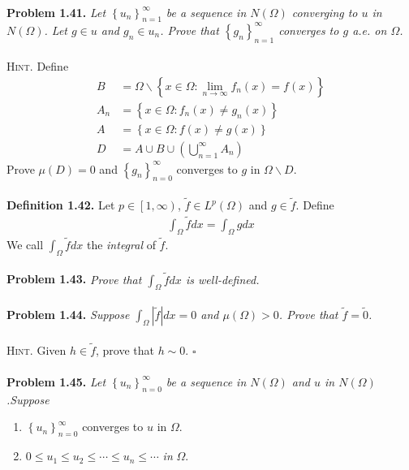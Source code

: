 \documentclass[a4paper]{article}
\numberwithin{equation}{section}
\begin{document}
\\
\textbf{Problem 1.41.} \textit{Let $\left\{ {{u_n}} \right\}_{n = 1}^\infty $ be a sequence in $N\left(\Omega\right)$ converging to $u$ in $N\left(\Omega\right)$. Let $g \in u$ and $g_n \in u_n$. Prove that $\left\{ {{g_n}} \right\}_{n = 1}^\infty $ converges to $g$ a.e. on $\Omega$.}\\
\\
\textsc{Hint.} Define
\begin{align}
B &= \Omega \backslash \left\{ {x \in \Omega :\mathop {\lim }\limits_{n \to \infty } {f_n}\left( x \right) = f\left( x \right)} \right\}\\
{A_n} &= \left\{ {x \in \Omega :{f_n}\left( x \right) \ne {g_n}\left( x \right)} \right\}\\
A &= \left\{ {x \in \Omega :f\left( x \right) \ne g\left( x \right)} \right\}\\
D &= A \cup B \cup \left( {\bigcup\limits_{n = 1}^\infty  {{A_n}} } \right)
\end{align}
Prove $\mu\left(D\right)=0$ and $\left\{ {{g_n}} \right\}_{n = 0}^\infty $ converges to $g$ in $\Omega \backslash D$.\\
\\
\textbf{Definition 1.42.} Let $p \in \left[1,\infty\right)$, $\widetilde f \in {L^p}\left( \Omega  \right)$ and $g\in \widetilde{f}$. Define
\begin{align}
\int_\Omega  {\widetilde fdx}  = \int_\Omega  {gdx} 
\end{align}
We call $\int_\Omega  {\widetilde fdx} $ the \textit{integral} of $\widetilde{f}$.\\
\\
\textbf{Problem 1.43.} \textit{Prove that $\int_\Omega  {\widetilde fdx} $ is well-defined.}\\
\\
\textbf{Problem 1.44.} \textit{Suppose $\int_\Omega  {\left| {\widetilde f} \right|dx}  = 0$ and $\mu \left(\Omega\right)>0$. Prove that $\widetilde{f}=\widetilde{0}$.}\\
\\
\textsc{Hint.} Given $h\in \tilde{f}$, prove that $h\sim 0$. \hfill $\square$\\
\\
\textbf{Problem 1.45.} \textit{Let $\left\{ {{u_n}} \right\}_{n = 0}^\infty $ be a sequence in $N\left(\Omega\right)$ and $u$ in $N\left(\Omega\right)$.Suppose}
\begin{enumerate}
\item $\left\{ {{u_n}} \right\}_{n = 0}^\infty $ converges to $u$ in $\Omega$.
\item $0 \le {u_1} \le {u_2} \le  \cdots  \le {u_n} \le  \cdots$ \textit{in} $\Omega $.
\end{enumerate}
\end{document}
